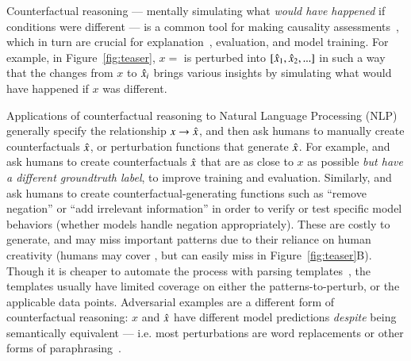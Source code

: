 Counterfactual reasoning --- mentally simulating what \emph{would have happened} if conditions were different --- is a common tool for making causality assessments~\cite{kahneman}, which in turn are crucial for explanation~\cite{miller}, evaluation, and model training. For example, in Figure~\ref{fig:teaser}, $x=$  is perturbed into $[\hat{x}_1, \hat{x}_2, ...]$ in such a way that the changes from $x$ to $\hat{x}_i$ brings various insights by simulating what would have happened if $x$ was different.

Applications of counterfactual reasoning to Natural Language Processing (NLP) generally specify the relationship $x \rightarrow \hat{x}$, and then ask humans to manually create counterfactuals $\hat{x}$, or perturbation functions that generate $\hat{x}$.
For example, \citet{gardner2020contrast} and \citet{kaushik2019learning} ask humans to create counterfactuals $\hat{x}$ that are as close to $x$ as possible \emph{but have a different groundtruth label}, to improve training and evaluation. 
Similarly, \citet{wu2019errudite} and \citet{checklist:acl20} ask humans to create counterfactual-generating functions such as ``remove negation'' or ``add irrelevant information'' in order to verify or test specific model behaviors (\eg whether models handle negation appropriately).
These are costly to generate, and may miss important patterns due to their reliance on human creativity (\eg humans may cover , but can easily miss  in Figure~\ref{fig:teaser}B).
Though it is cheaper to automate the process with parsing templates~\cite{li2020linguistically}, the templates usually have limited coverage on either the patterns-to-perturb, or the applicable data points.
Adversarial examples are a different form of counterfactual reasoning: $x$ and $\hat{x}$ have different model predictions \emph{despite} being semantically equivalent --- i.e. most perturbations are word replacements or other forms of paraphrasing~\cite{iyyer2018adversarial, ribeiro2018semantically}.



